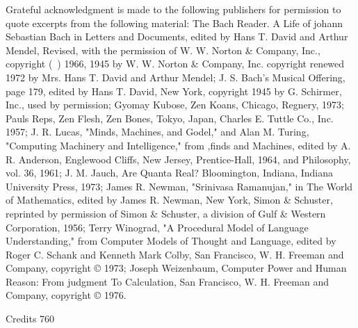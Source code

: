 Grateful acknowledgment is made to the following publishers for permission to quote
excerpts from the following material: The Bach Reader. A Life of johann Sebastian Bach
in Letters and Documents, edited by Hans T. David and Arthur Mendel, Revised, with the
permission of W. W. Norton \& Company, Inc., copyright (~) 1966, 1945 by W. W.
Norton \& Company, Inc. copyright renewed 1972 by Mrs. Hans T. David and Arthur
Mendel; J. S. Bach's Musical Offering, page 179, edited by Hans T. David, New York,
copyright 1945 by G. Schirmer, Inc., used by permission; Gyomay Kubose, Zen Koans,
Chicago, Regnery, 1973; Pauls Reps, Zen Flesh, Zen Bones, Tokyo, Japan, Charles E.
Tuttle Co., Inc. 1957; J. R. Lucas, "Minds, Machines, and Godel," and Alan M. Turing,
"Computing Machinery and Intelligence," from ,finds and Machines, edited by A. R.
Anderson, Englewood Cliffs, New Jersey, Prentice-Hall, 1964, and Philosophy, vol. 36,
1961; J. M. Jauch, Are Quanta Real? Bloomington, Indiana, Indiana University Press,
1973; James R. Newman, "Srinivasa Ramanujan," in The World of Mathematics, edited
by James R. Newman, New York, Simon \& Schuster, reprinted by permission of Simon
\& Schuster, a division of Gulf \& Western Corporation, 1956; Terry Winograd, "A
Procedural Model of Language Understanding," from Computer Models of Thought and
Language, edited by Roger C. Schank and Kenneth Mark Colby, San Francisco, W. H.
Freeman and Company, copyright © 1973; Joseph Weizenbaum, Computer Power and
Human Reason: From judgment To Calculation, San Francisco, W. H. Freeman and
Company, copyright © 1976.

Credits                                                                             760

